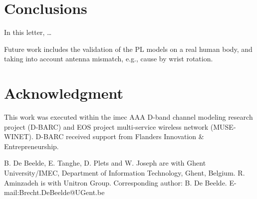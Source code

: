 \documentclass[preprint]{rsl}
\begin{document}
\section{Conclusions\label{sect:conclusion}}

In this letter, \dots

Future work includes the validation of the PL models on a real human body, and taking into account antenna mismatch, e.g., cause by wrist rotation.

\section{Acknowledgment}

This work was executed within the imec AAA D-band channel modeling research project (D-BARC) and EOS project multi-service wireless network (MUSE-WINET). 
D-BARC received support from Flanders Innovation \& Entrepreneurship.

\vspace{3pt}

\suppressfloats


\suppressfloats

\vspace{7pt}

%
%
\noindent\small
B. De Beelde, E. Tanghe, D. Plets and W. Joseph are with Ghent University/IMEC, Department of Information Technology, Ghent, Belgium. 
R. Aminzadeh is with Unitron Group. 
Corresponding author: B. De Beelde. 
E-mail:Brecht.DeBeelde@UGent.be
\end{document}
